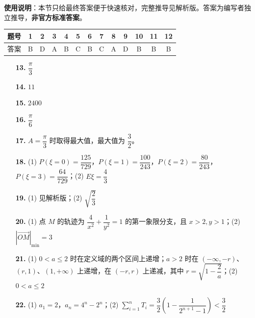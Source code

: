 
\begin{gknotice}
\textbf{使用说明}：本节只给最终答案便于快速核对，完整推导见解析版。答案为编写者独立推导，\textbf{非官方标准答案}。
\end{gknotice}

\begin{center}\begin{tabular}{ccccccccccccc}
\toprule
题号 & 1 & 2 & 3 & 4 & 5 & 6 & 7 & 8 & 9 & 10 & 11 & 12 \\
\midrule
答案 & B & D & A & B & C & B & C & A & D & B & B & B \\
\bottomrule
\end{tabular}\end{center}

\begin{itemize}[leftmargin=2.6em]
  \item[\textbf{13.}] $\dfrac\pi3$
  \item[\textbf{14.}] $11$
  \item[\textbf{15.}] $2400$
  \item[\textbf{16.}] $\dfrac\pi6$
\end{itemize}

\begin{itemize}[leftmargin=2.6em]
  \item[\textbf{17.}] $A=\dfrac\pi3$ 时取得最大值，最大值为 $\dfrac32$。
  \item[\textbf{18.}] (1) $P(\xi=0)=\dfrac{125}{729}$，$P(\xi=1)=\dfrac{100}{243}$，$P(\xi=2)=\dfrac{80}{243}$，$P(\xi=3)=\dfrac{64}{729}$；(2) $E\xi=\dfrac43$
  \item[\textbf{19.}] (1) 见解析版；(2) $\sqrt{\dfrac23}$
  \item[\textbf{20.}] (1) 点 $M$ 的轨迹为 $\dfrac4{x^2}+\dfrac1{y^2}=1$ 的第一象限分支，且 $x>2,y>1$；(2) $|\overrightarrow{OM}|_{\min}=3$
  \item[\textbf{21.}] (1) $0<a\leqslant2$ 时在定义域的两个区间上递增；$a>2$ 时在 $(-\infty,-r)$、$(r,1)$、$(1,+\infty)$ 上递增，在 $(-r,r)$ 上递减，其中 $r=\sqrt{1-\dfrac2a}$；(2) $0<a\leqslant2$
  \item[\textbf{22.}] (1) $a_1=2$，$a_n=4^n-2^n$；(2) $\displaystyle\sum_{i=1}^nT_i=\dfrac32\left(1-\dfrac1{2^{n+1}-1}\right)<\dfrac32$
\end{itemize}
